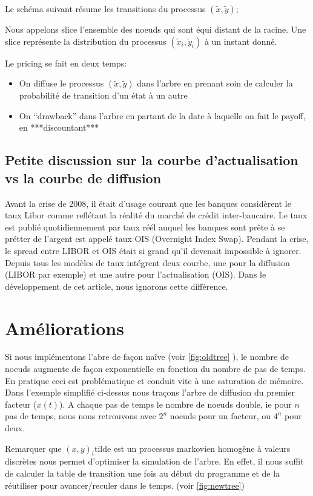 Le schéma suivant résume les transitions du processus {$(\widetilde{x}, \widetilde{y})$};



Nous appelons slice l'ensemble des noeuds qui sont équi distant de la racine. Une slice représente la distribution du processus $( \widetilde{x}_i, \widetilde{y}_i)$ à un instant donné.

Le pricing se fait en deux temps:
\begin{itemize}
\item On diffuse le processus $(\widetilde{x}, \widetilde{y})$ dans l'arbre en prenant soin de calculer la probabilité de transition d'un état à un autre
\item On ``drawback'' dans l'arbre en partant de la date à laquelle on fait le payoff, en ***discountant***
\end{itemize}

  \subsection*{Petite discussion sur la courbe d'actualisation vs la courbe de diffusion}
  Avant la crise de 2008, il était d'usage courant que les banques considèrent le taux Libor comme reflétant la réalité du marché de crédit inter-bancaire. Le taux est publié quotidiennement par
taux réél auquel les banques sont prête à se prétter de l'argent est appelé taux OIS (Overnight Index Swap).  
Pendant la crise, le spread entre LIBOR et OIS était si grand qu'il devenait impossible à ignorer. Depuis tous les modèles de taux intégrent deux courbe, une pour la diffusion (LIBOR par exemple) et une autre pour l'actualisation (OIS).
Dans le développement de cet article, nous ignorons cette différence.
  
\section{Améliorations}
Si nous implémentons l'abre de façon naîve (voir \ref{fig:oldtree} ), le nombre de noeuds augmente de façon exponentielle en fonction du nombre de pas de temps. En pratique ceci est problématique et conduit vite à une saturation de mémoire. Dans l'exemple simplifié ci-dessus nous traçons l'arbre de diffusion du premier facteur ($x(t)$). A chaque pas de temps le nombre de noeuds double, ie pour $n$ pas de temps, nous nous retrouvons avec $2^n$ noeuds pour un facteur, ou $4^n$ pour deux. 



Remarquer que $(x, y)_i$tilde est un processus markovien homogène à valeurs discrètes nous permet d'optimiser la simulation de l'arbre. En effet, il nous suffit de calculer la table de transition une fois au début du programme et de la réutiliser pour avancer/reculer dans le temps. (voir \ref{fig:newtree})


